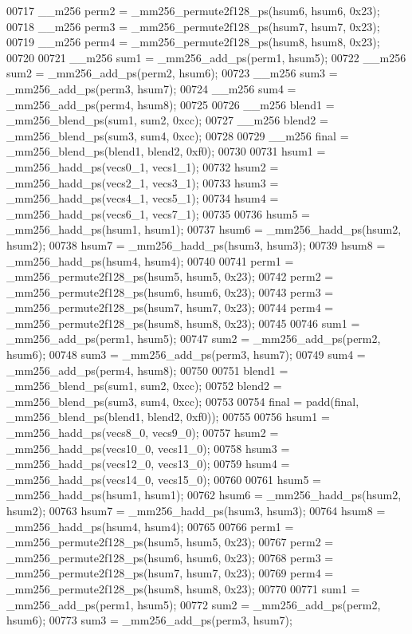 \begin{DoxyCode}
00717   \_\_m256 perm2 = \_mm256\_permute2f128\_ps(hsum6, hsum6, 0x23);
00718   \_\_m256 perm3 = \_mm256\_permute2f128\_ps(hsum7, hsum7, 0x23);
00719   \_\_m256 perm4 = \_mm256\_permute2f128\_ps(hsum8, hsum8, 0x23);
00720 
00721   \_\_m256 sum1 = \_mm256\_add\_ps(perm1, hsum5);
00722   \_\_m256 sum2 = \_mm256\_add\_ps(perm2, hsum6);
00723   \_\_m256 sum3 = \_mm256\_add\_ps(perm3, hsum7);
00724   \_\_m256 sum4 = \_mm256\_add\_ps(perm4, hsum8);
00725 
00726   \_\_m256 blend1 = \_mm256\_blend\_ps(sum1, sum2, 0xcc);
00727   \_\_m256 blend2 = \_mm256\_blend\_ps(sum3, sum4, 0xcc);
00728 
00729   \_\_m256 \textcolor{keyword}{final} = \_mm256\_blend\_ps(blend1, blend2, 0xf0);
00730 
00731   hsum1 = \_mm256\_hadd\_ps(vecs0\_1, vecs1\_1);
00732   hsum2 = \_mm256\_hadd\_ps(vecs2\_1, vecs3\_1);
00733   hsum3 = \_mm256\_hadd\_ps(vecs4\_1, vecs5\_1);
00734   hsum4 = \_mm256\_hadd\_ps(vecs6\_1, vecs7\_1);
00735 
00736   hsum5 = \_mm256\_hadd\_ps(hsum1, hsum1);
00737   hsum6 = \_mm256\_hadd\_ps(hsum2, hsum2);
00738   hsum7 = \_mm256\_hadd\_ps(hsum3, hsum3);
00739   hsum8 = \_mm256\_hadd\_ps(hsum4, hsum4);
00740 
00741   perm1 = \_mm256\_permute2f128\_ps(hsum5, hsum5, 0x23);
00742   perm2 = \_mm256\_permute2f128\_ps(hsum6, hsum6, 0x23);
00743   perm3 = \_mm256\_permute2f128\_ps(hsum7, hsum7, 0x23);
00744   perm4 = \_mm256\_permute2f128\_ps(hsum8, hsum8, 0x23);
00745 
00746   sum1 = \_mm256\_add\_ps(perm1, hsum5);
00747   sum2 = \_mm256\_add\_ps(perm2, hsum6);
00748   sum3 = \_mm256\_add\_ps(perm3, hsum7);
00749   sum4 = \_mm256\_add\_ps(perm4, hsum8);
00750 
00751   blend1 = \_mm256\_blend\_ps(sum1, sum2, 0xcc);
00752   blend2 = \_mm256\_blend\_ps(sum3, sum4, 0xcc);
00753 
00754   \textcolor{keyword}{final} = padd(\textcolor{keyword}{final}, \_mm256\_blend\_ps(blend1, blend2, 0xf0));
00755 
00756   hsum1 = \_mm256\_hadd\_ps(vecs8\_0, vecs9\_0);
00757   hsum2 = \_mm256\_hadd\_ps(vecs10\_0, vecs11\_0);
00758   hsum3 = \_mm256\_hadd\_ps(vecs12\_0, vecs13\_0);
00759   hsum4 = \_mm256\_hadd\_ps(vecs14\_0, vecs15\_0);
00760 
00761   hsum5 = \_mm256\_hadd\_ps(hsum1, hsum1);
00762   hsum6 = \_mm256\_hadd\_ps(hsum2, hsum2);
00763   hsum7 = \_mm256\_hadd\_ps(hsum3, hsum3);
00764   hsum8 = \_mm256\_hadd\_ps(hsum4, hsum4);
00765 
00766   perm1 = \_mm256\_permute2f128\_ps(hsum5, hsum5, 0x23);
00767   perm2 = \_mm256\_permute2f128\_ps(hsum6, hsum6, 0x23);
00768   perm3 = \_mm256\_permute2f128\_ps(hsum7, hsum7, 0x23);
00769   perm4 = \_mm256\_permute2f128\_ps(hsum8, hsum8, 0x23);
00770 
00771   sum1 = \_mm256\_add\_ps(perm1, hsum5);
00772   sum2 = \_mm256\_add\_ps(perm2, hsum6);
00773   sum3 = \_mm256\_add\_ps(perm3, hsum7);

\end{DoxyCode}
